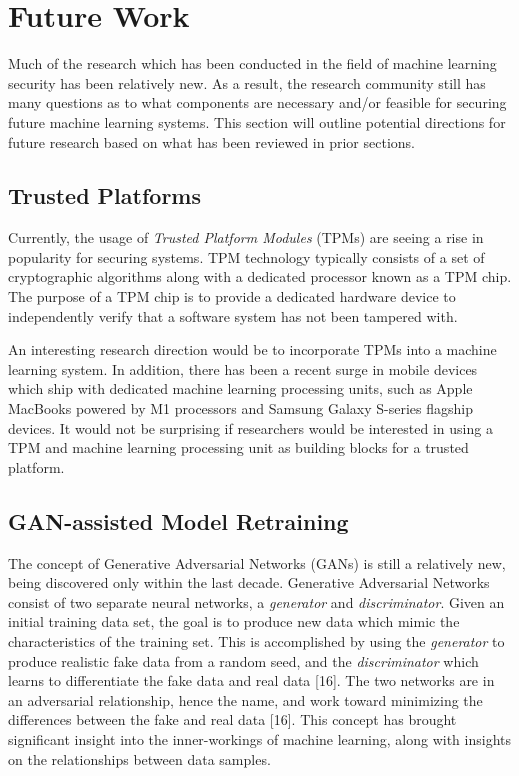 \documentclass[11pt,conference]{IEEEtran}
\begin{document}
\section{Future Work}
Much of the research which has been conducted in the field of machine learning
security has been relatively new. As a result, the research community still has
many questions as to what components are necessary and/or feasible for securing
future machine learning systems.
This section will outline potential directions for future research based on
what has been reviewed in prior sections.

\subsection{Trusted Platforms}
Currently, the usage of \emph{Trusted Platform Modules} (TPMs) are seeing a
rise in popularity for securing systems. TPM technology typically consists of a
set of cryptographic algorithms along with a dedicated processor known as a TPM
chip. The purpose of a TPM chip is to provide a dedicated hardware device to
independently verify that a software system has not been tampered with. 

An interesting research direction would be to incorporate TPMs into a machine
learning system. In addition, there has been a recent surge in mobile devices
which ship with dedicated machine learning processing units, such as Apple
MacBooks powered by M1 processors and Samsung Galaxy S-series flagship devices.
It would not be surprising if researchers would be interested in using a TPM
and machine learning processing unit as building blocks for a trusted platform.

\subsection{GAN-assisted Model Retraining}
The concept of Generative Adversarial Networks (GANs) is still a relatively
new, being discovered only within the last decade. Generative Adversarial
Networks consist of two separate neural networks, a \emph{generator}
and \emph{discriminator}. Given an initial training data set, the goal is to
produce new data which mimic the characteristics of the training set. This is
accomplished by using the \emph{generator} to produce realistic fake data from
a random seed, and the \emph{discriminator} which learns to differentiate the
fake data and real data [16]. The two networks are in an adversarial relationship,
hence the name, and work toward minimizing the differences between the fake and
real data [16]. This concept has brought significant insight into the inner-workings
of machine learning, along with insights on the relationships between data
samples.
\end{document}
